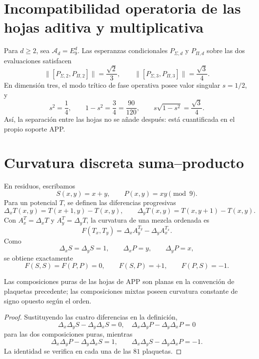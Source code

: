 \section{Incompatibilidad operatoria de las hojas aditiva y multiplicativa}

Para \(d\ge2\), sea \(\mathscr A_d=E_9^d\). Las esperanzas condicionales
\(P_{\Sigma,d}\) y \(P_{\Pi,d}\) sobre las dos evaluaciones satisfacen
\[
 \|[P_{\Sigma,2},P_{\Pi,2}]\|=\frac{\sqrt2}{3},
 \qquad
 \|[P_{\Sigma,3},P_{\Pi,3}]\|=\frac{\sqrt3}{4}.
\]
En dimensión tres, el modo trítico de fase operativa posee valor singular
\(s=1/2\), y
\[
 s^2=\frac14,\qquad 1-s^2=\frac34=\frac{90}{120},
 \qquad s\sqrt{1-s^2}=\frac{\sqrt3}{4}.
\]
Así, la separación entre las hojas no se añade después: está cuantificada en
el propio soporte APP.

\section{Curvatura discreta suma--producto}

En residuos, escribamos
\[
 S(x,y)=x+y,\qquad P(x,y)=xy\pmod9.
\]
Para un potencial \(T\), se definen las diferencias progresivas
\[
 \Delta_xT(x,y)=T(x+1,y)-T(x,y),\qquad
 \Delta_yT(x,y)=T(x,y+1)-T(x,y).
\]
Con \(A_x^T=\Delta_xT\) y \(A_y^T=\Delta_yT\), la curvatura de una mezcla
ordenada es
\[
 F(T_x,T_y)=\Delta_xA_y^{T_y}-\Delta_yA_x^{T_x}.
\]
Como
\[
 \Delta_xS=\Delta_yS=1,\qquad
 \Delta_xP=y,\qquad \Delta_yP=x,
\]
se obtiene exactamente
\begin{equation}
 F(S,S)=F(P,P)=0,\qquad
 F(S,P)=+1,\qquad F(P,S)=-1.
 \label{espiral:eq:curvatura-mixta-app}
\end{equation}

\begin{theorem}
Las composiciones puras de las hojas de APP son planas en la convención de
plaquetas precedente; las composiciones mixtas poseen curvatura constante de
signo opuesto según el orden.
\end{theorem}
\begin{proof}
Sustituyendo las cuatro diferencias en la definición,
\[
 \Delta_x\Delta_yS-\Delta_y\Delta_xS=0,
 \quad
 \Delta_x\Delta_yP-\Delta_y\Delta_xP=0
\]
para las dos composiciones puras, mientras
\[
 \Delta_x\Delta_yP-\Delta_y\Delta_xS=1,
 \qquad
 \Delta_x\Delta_yS-\Delta_y\Delta_xP=-1.
\]
La identidad se verifica en cada una de las \(81\) plaquetas.
\end{proof}

